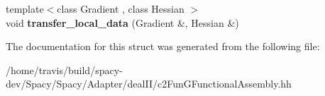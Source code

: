 \begin{DoxyCompactItemize}
\item 
\hypertarget{structSpacy_1_1dealII_1_1Detail_1_1DerivativeUpdate_3_01dim_00_01VariableDims_00_01row_00-1_01_4_a4d4673237a232cc934eabd585798800e}{{\footnotesize template$<$class Gradient , class Hessian $>$ }\\void {\bfseries transfer\-\_\-local\-\_\-data} (Gradient \&, Hessian \&)}\label{structSpacy_1_1dealII_1_1Detail_1_1DerivativeUpdate_3_01dim_00_01VariableDims_00_01row_00-1_01_4_a4d4673237a232cc934eabd585798800e}

\end{DoxyCompactItemize}


The documentation for this struct was generated from the following file\-:\begin{DoxyCompactItemize}
\item 
/home/travis/build/spacy-\/dev/\-Spacy/\-Spacy/\-Adapter/deal\-I\-I/c2\-Fun\-G\-Functional\-Assembly.\-hh\end{DoxyCompactItemize}

